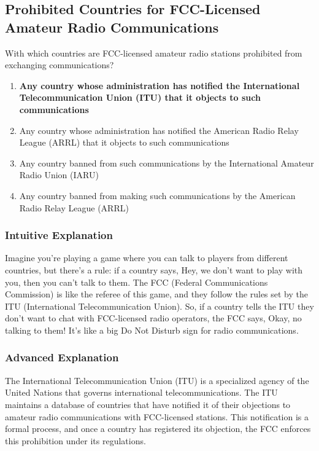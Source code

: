 \subsection{Prohibited Countries for FCC-Licensed Amateur Radio Communications}
\label{T1D01}

\begin{tcolorbox}[colback=gray!10!white,colframe=black!75!black,title=T1D01]
With which countries are FCC-licensed amateur radio stations prohibited from exchanging communications?
\begin{enumerate}[label=\Alph*)]
    \item \textbf{Any country whose administration has notified the International Telecommunication Union (ITU) that it objects to such communications}
    \item Any country whose administration has notified the American Radio Relay League (ARRL) that it objects to such communications
    \item Any country banned from such communications by the International Amateur Radio Union (IARU)
    \item Any country banned from making such communications by the American Radio Relay League (ARRL)
\end{enumerate}
\end{tcolorbox}

\subsubsection{Intuitive Explanation}
Imagine you're playing a game where you can talk to players from different countries, but there's a rule: if a country says, Hey, we don't want to play with you, then you can't talk to them. The FCC (Federal Communications Commission) is like the referee of this game, and they follow the rules set by the ITU (International Telecommunication Union). So, if a country tells the ITU they don't want to chat with FCC-licensed radio operators, the FCC says, Okay, no talking to them! It's like a big Do Not Disturb sign for radio communications.

\subsubsection{Advanced Explanation}
The International Telecommunication Union (ITU) is a specialized agency of the United Nations that governs international telecommunications. The ITU maintains a database of countries that have notified it of their objections to amateur radio communications with FCC-licensed stations. This notification is a formal process, and once a country has registered its objection, the FCC enforces this prohibition under its regulations.

